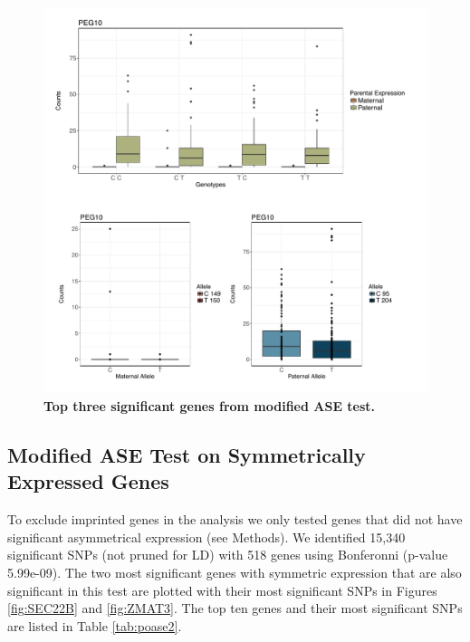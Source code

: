 \begin{figure}[!htb]
\centering \includegraphics[width=5in]{img/ch04/fig-11-PEG10.pdf}
\caption[Top three significant genes from modified ASE test.]{\textbf{Top three significant genes from modified ASE test.} }
\label{fig:PEG10}
\end{figure}

\subsection{Modified ASE Test on Symmetrically Expressed Genes}\label{Modified ASE Test on Symmetrically Expressed Genes} 
To exclude imprinted genes in the analysis we only tested genes that did not have significant asymmetrical expression (see Methods). We identified 15,340 significant SNPs (not pruned for LD) with 518 genes using Bonferonni (p-value 5.99e-09). The two most significant genes with symmetric expression that are also significant in this test are plotted with their most significant SNPs in Figures \ref{fig:SEC22B} and \ref{fig:ZMAT3}. The top ten genes and their most significant SNPs are listed in Table \ref{tab:poase2}.


